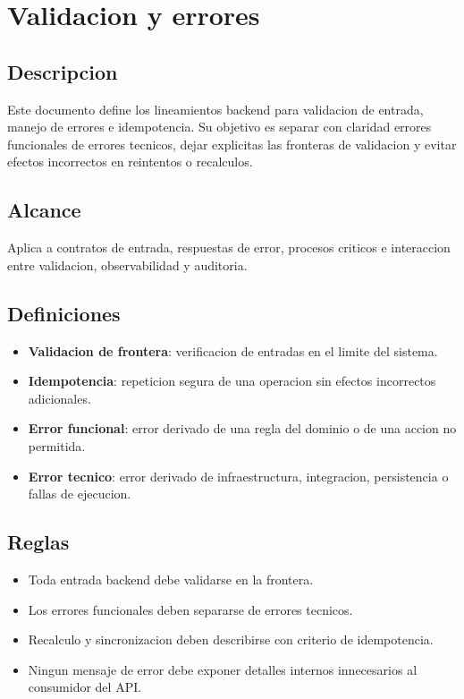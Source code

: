 \section{Validacion y errores}

\subsection{Descripcion}

Este documento define los lineamientos backend para validacion de entrada, manejo de errores e idempotencia. Su objetivo es separar con claridad errores funcionales de errores tecnicos, dejar explicitas las fronteras de validacion y evitar efectos incorrectos en reintentos o recalculos.

\subsection{Alcance}

Aplica a contratos de entrada, respuestas de error, procesos criticos e interaccion entre validacion, observabilidad y auditoria.

\subsection{Definiciones}

\begin{itemize}
  \item \textbf{Validacion de frontera}: verificacion de entradas en el limite del sistema.
  \item \textbf{Idempotencia}: repeticion segura de una operacion sin efectos incorrectos adicionales.
  \item \textbf{Error funcional}: error derivado de una regla del dominio o de una accion no permitida.
  \item \textbf{Error tecnico}: error derivado de infraestructura, integracion, persistencia o fallas de ejecucion.
\end{itemize}

\subsection{Reglas}

\begin{itemize}
  \item Toda entrada backend debe validarse en la frontera.
  \item Los errores funcionales deben separarse de errores tecnicos.
  \item Recalculo y sincronizacion deben describirse con criterio de idempotencia.
  \item Ningun mensaje de error debe exponer detalles internos innecesarios al consumidor del API.
\end{itemize}

